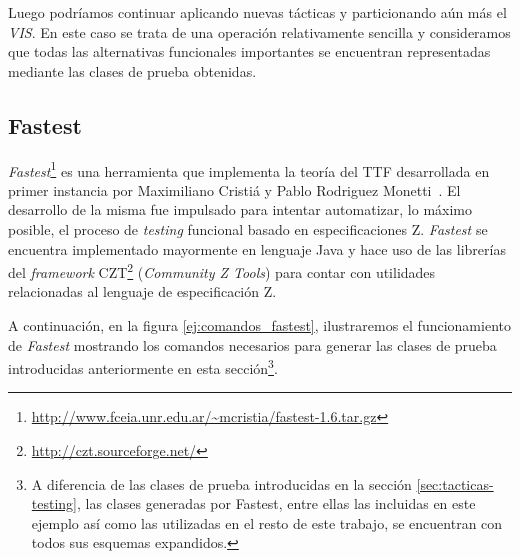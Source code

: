 Luego podríamos continuar aplicando nuevas tácticas y particionando aún más el \emph{VIS}. En este caso se trata de una operación relativamente sencilla y consideramos que todas las alternativas funcionales importantes se encuentran representadas mediante las clases de prueba obtenidas.

\subsection{Fastest}
\label{sec:fastest}

\emph{Fastest}\footnote{\url{http://www.fceia.unr.edu.ar/~mcristia/fastest-1.6.tar.gz}} es una herramienta que implementa la teoría del TTF desarrollada en primer instancia por Maximiliano Cristiá y Pablo Rodriguez Monetti~\cite{fastest1}. El desarrollo de la misma fue impulsado para intentar automatizar, lo máximo posible, el proceso de \textit{testing} funcional basado en especificaciones Z. \emph{Fastest} se encuentra implementado mayormente en lenguaje Java y hace uso de las librerías del \textit{framework} CZT\footnote{\url{http://czt.sourceforge.net/}} (\emph{Community Z Tools}) para contar con utilidades relacionadas al lenguaje de especificación Z. 

A continuación, en la figura \ref{ej:comandos_fastest}, ilustraremos el funcionamiento de \emph{Fastest} mostrando los comandos necesarios para generar las clases de prueba introducidas anteriormente en esta sección\footnote{A diferencia de las clases de prueba introducidas en la sección \ref{sec:tacticas-testing}, las clases generadas por Fastest, entre ellas las incluidas en este ejemplo así como las utilizadas en el resto de este trabajo, se encuentran con todos sus esquemas expandidos.}.


